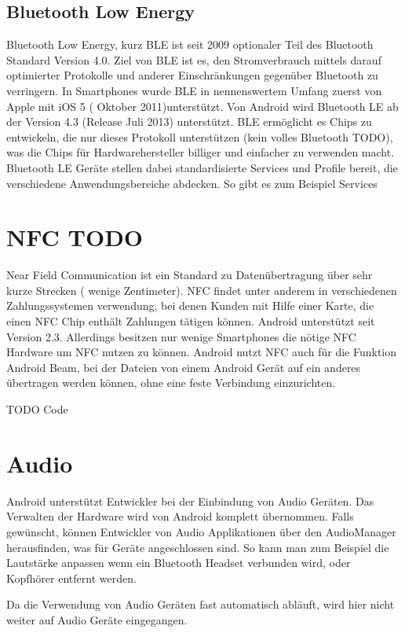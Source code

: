 \documentclass[12pt,journal,compsoc]{IEEEtran}
\begin{document}
\subsection{Bluetooth Low Energy}
Bluetooth Low Energy, kurz BLE ist seit 2009 optionaler Teil des Bluetooth Standard Version 4.0. 
Ziel von BLE ist es, den Stromverbrauch mittels darauf optimierter Protokolle und anderer Einschränkungen gegenüber Bluetooth zu verringern.
In Smartphones wurde BLE in nennenswertem Umfang zuerst von Apple mit iOS 5 ( Oktober 2011)unterstützt.
Von Android wird Bluetooth LE ab der Version 4.3 (Release Juli 2013) unterstützt.
BLE ermöglicht es Chips zu entwickeln, die nur dieses Protokoll unterstützen (kein volles Bluetooth TODO), was die Chips für Hardwarehersteller billiger und einfacher zu verwenden macht.
Bluetooth LE Geräte stellen dabei standardisierte Services und Profile bereit, die verschiedene Anwendungsbereiche abdecken.
So gibt es zum Beispiel Services  
\cite{bluetooth}

\section{NFC TODO}
Near Field Communication ist ein Standard zu Datenübertragung über sehr kurze Strecken ( wenige Zentimeter). 
NFC findet unter anderem in verschiedenen Zahlungssystemen verwendung, bei denen Kunden mit Hilfe einer Karte, die einen NFC Chip enthält Zahlungen tätigen können.
Android unterstützt seit Version 2.3. Allerdings besitzen nur wenige Smartphones die nötige NFC Hardware um NFC nutzen zu können.
Android nutzt NFC auch für die Funktion Android Beam, bei der Dateien von einem Android Gerät auf ein anderes übertragen werden können, ohne eine feste Verbindung einzurichten.

TODO Code



\section{Audio}
Android unterstützt Entwickler bei der Einbindung von Audio Geräten. Das Verwalten der Hardware wird von Android komplett übernommen.
Falls gewünscht, können Entwickler von Audio Applikationen über den AudioManager herausfinden, was für Geräte angeschlossen sind. So kann man zum Beispiel die Lautstärke anpassen wenn ein Bluetooth Headset verbunden wird, oder Kopfhörer entfernt werden.

Da die Verwendung von Audio Geräten fast automatisch abläuft, wird hier nicht weiter auf Audio Geräte eingegangen.
\end{document}
